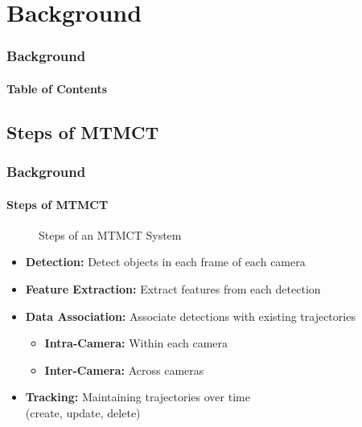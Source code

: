 \section{Background}
\begin{frame}
    \frametitle{Background}
    \framesubtitle{Table of Contents}
    {
        \hypersetup{hidelinks}
    }
\end{frame}

\subsection{Steps of MTMCT}
\begin{frame}
    \frametitle{Background}
    \framesubtitle{Steps of MTMCT}

    \begin{figure}[ht]
        \centering
        
        \caption{Steps of an MTMCT System}\label{fig:mtmct_steps}
    \end{figure}

    \begin{itemize}
        \item <2->\textbf{Detection:} Detect objects in each frame of each camera
              \vspace{5pt}
        \item <3->\textbf{Feature Extraction:} Extract features from each detection
              \vspace{5pt}
        \item <4->\textbf{Data Association:} Associate detections with existing trajectories
              \begin{itemize}
                  \item \textbf{Intra-Camera:} Within each camera
                  \item \textbf{Inter-Camera:} Across cameras
              \end{itemize}
              \vspace{5pt}
        \item <5->\textbf{Tracking:} Maintaining trajectories over time\\(create, update, delete)
    \end{itemize}
\end{frame}

